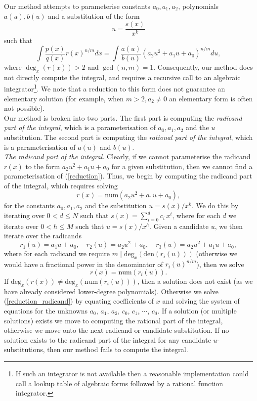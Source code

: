 \documentclass[12pt]{article}
\numberwithin{equation}{section}
\theoremstyle{definition}
\begin{document}
Our method attempts to parameterise constants $a_0, a_1, a_2$, polynomials $a(u), b(u)$ and a 
substitution of the form 
$$u = \frac{s(x)}{x^k}$$ 
such that
\begin{equation}
\int \frac{p(x)}{q(x)}r(x)^{n/m}dx = \int \frac{a(u)}{b(u)}\left(a_2u^2+a_1u+a_0\right)^{n/m}du,\label{reduction}
\end{equation}
where $\deg_x(r(x))>2$ and $\gcd (n,m)=1$. Consequently, our method does not directly compute the 
integral, and requires a recursive call to an algebraic integrator\footnote{If such an integrator is not 
available then a reasonable implementation could call a lookup table of algebraic forms\cite{Prudnikov1986} 
followed by a rational function integrator\cite{Bronstein1997}.}. We note that a reduction to this form
does not guarantee an elementary solution (for example, when $m>2,a_2\ne0$ an elementary form 
is often not possible). \\

Our method is broken into two parts. The first part is computing the \textit{radicand part of 
the integral}, which is a parameterisation of $a_0,a_1,a_2$ and the $u$ 
substitution. The second part is computing the \textit{rational part of the integral}, which is 
a parameterisation of $a(u)$ and $b(u)$.\\

\textit{The radicand part of the integral.} Clearly, if we cannot parameterise the radicand $r(x)$ 
to the form $a_2u^2+a_1u+a_0$ for a given substitution, then we cannot find a 
parameterisation of (\ref{reduction}). Thus, we begin by computing the radicand part 
of the integral, which requires solving 
$$r(x) = \text{num}\left( a_2u^2 + a_1u + a_0 \right),$$
for the constants $a_0,a_1,a_2$ and the substitution $u = s(x)/x^k$. We do this by iterating over 
$0 < d \leq N$ such that $s(x) = \sum\limits_{i=0}^{d} c_i\,x^{i}$, where for each $d$ we 
iterate over $0 < h \leq M$ such that $u = s(x)/x^h$. Given a candidate $u$, we then iterate over 
the radicands 
$$r_1(u) = a_1 u + a_0,\quad r_2(u) = a_2 u^2 + a_0, \quad r_3(u) = a_2 u^2 + a_1 u + a_0,$$ 
where for each radicand we require $m \mid \text{deg}_x\left(\text{den}\left(r_i(u)\right)\right)$ 
(otherwise we would have a fractional power in the denominator of $r_i(u)^{n/m}$), then we solve 
\begin{equation}
r(x) = \text{num}\left(r_i(u)\right).\label{reduction_radicand}
\end{equation}
If $\text{deg}_x\left(r(x)\right) \ne \text{deg}_x\left( \text{num}\left(r_i(u)\right) \right)$, then 
a solution does not exist (as we have already considered lower-degree polynomials).
Otherwise we solve (\ref{reduction_radicand}) by equating coefficients of $x$ and solving the system of 
equations for the unknowns $a_0$, $a_1$, $a_2$, $c_0$, $c_1$, $\cdots$, $c_d$. If a solution 
(or multiple solutions) exists we move to computing the rational part of the integral, otherwise 
we move onto the next radicand or candidate substitution. If no solution exists to the radicand 
part of the integral for any candidate $u$-substitutions, then our method fails to 
compute the integral.\\
\end{document}
